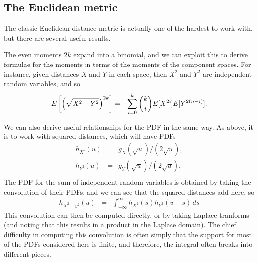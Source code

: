 \documentclass{article}
\begin{document}
\subsection{The Euclidean metric}

The classic Euclidean distance metric is actually one of the hardest
to work with, but there are several useful results.

The even moments $2k$ expand into a binomial, and we can exploit this
to derive formulae for the moments in terms of the moments of the
component spaces. For instance, given distances $X$ and $Y$ in each
space, then $X^2$ and $Y^2$ are independent random variables, and so
\begin{eqnarray}
  E\left[ \left( \sqrt{ X^2 + Y^2} \right)^{2k} \right] 
   & = & \sum_{i=0}^{k} \dbinom{k}{i} E[X^{2i}] E[Y^{2(n-i)}].
\end{eqnarray}






We can also derive useful relationships for the PDF in the same
way. As above, it is  to work with squared distances, which will have
PDFs 
\begin{eqnarray}
  \label{eq:h_g}
  h_{X^2}(u) & = & g_X(\sqrt{u})/(2\sqrt{u}), \\
  h_{Y^2}(u) & = & g_Y(\sqrt{u})/(2\sqrt{u}), \\
\end{eqnarray}
The PDF for the sum of independent random variables is
obtained by taking the convolution of their PDFs, and we can see that
the squared distances add here, so
\begin{eqnarray}
  \label{eq:add_euclidean}
  h_{X^2+y^2}(u) & = & \int_{-\infty}^\infty h_{X^2}(s)  h_{Y^2}(u-s) \, ds
\end{eqnarray}
This convolution can then be computed directly, or by taking Laplace
tranforms (and noting that this results in a product in the Laplace
domain).  The chief difficulty in computing this convolution is often
simply that the support for most of the PDFs considered here is
finite, and therefore, the integral often breaks into different
pieces.
\end{document}
